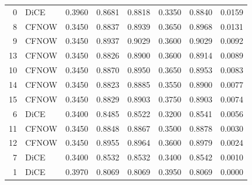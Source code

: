 \begin{tabular}{rlrrrrrr}
     0 &   DiCE &      0.3960 &            0.8681 &                     0.8818 &                   0.3350 &               0.8840 &                   0.0159 \\
     8 &  CFNOW &      0.3450 &            0.8837 &                     0.8939 &                   0.3650 &               0.8968 &                   0.0131 \\
     9 &  CFNOW &      0.3450 &            0.8937 &                     0.9029 &                   0.3600 &               0.9029 &                   0.0092 \\
    13 &  CFNOW &      0.3450 &            0.8826 &                     0.8900 &                   0.3600 &               0.8914 &                   0.0089 \\
    10 &  CFNOW &      0.3450 &            0.8870 &                     0.8950 &                   0.3650 &               0.8953 &                   0.0083 \\
    14 &  CFNOW &      0.3450 &            0.8823 &                     0.8885 &                   0.3550 &               0.8900 &                   0.0077 \\
    15 &  CFNOW &      0.3450 &            0.8829 &                     0.8903 &                   0.3750 &               0.8903 &                   0.0074 \\
     6 &   DiCE &      0.3400 &            0.8485 &                     0.8522 &                   0.3200 &               0.8541 &                   0.0056 \\
    11 &  CFNOW &      0.3450 &            0.8848 &                     0.8867 &                   0.3500 &               0.8878 &                   0.0030 \\
    12 &  CFNOW &      0.3450 &            0.8955 &                     0.8964 &                   0.3600 &               0.8979 &                   0.0024 \\
     7 &   DiCE &      0.3400 &            0.8532 &                     0.8532 &                   0.3400 &               0.8542 &                   0.0010 \\
     1 &   DiCE &      0.3970 &            0.8069 &                     0.8069 &                   0.3950 &               0.8069 &                   0.0000 \\
\bottomrule
\end{tabular}
